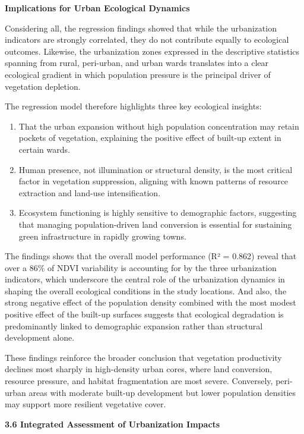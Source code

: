 \textbf{Implications for Urban Ecological Dynamics}

Considering all, the regression findings showed that while the urbanization indicators are strongly correlated, they do not contribute equally to ecological outcomes. Likewise, the urbanization zones expressed in the descriptive statistics spanning from rural, peri-urban, and urban wards translates into a clear ecological gradient in which population pressure is the principal driver of vegetation depletion.

The regression model therefore highlights three key ecological insights:

\begin{enumerate}
\def\labelenumi{\arabic{enumi}.}
\item
  That the urban expansion without high population concentration may retain pockets of vegetation, explaining the positive effect of built-up extent in certain wards.
\item
  Human presence, not illumination or structural density, is the most critical factor in vegetation suppression, aligning with known patterns of resource extraction and land-use intensification.
\item
  Ecosystem functioning is highly sensitive to demographic factors, suggesting that managing population-driven land conversion is essential for sustaining green infrastructure in rapidly growing towns.
\end{enumerate}

The findings shows that the overall model performance (R² = 0.862) reveal that over a 86\% of NDVI variability is accounting for by the three urbanization indicators, which underscore the central role of the urbanization dynamics in shaping the overall ecological conditions in the study locations. And also, the strong negative effect of the population density combined with the most modest positive effect of the built-up surfaces suggests that ecological degradation is predominantly linked to demographic expansion rather than structural development alone.

These findings reinforce the broader conclusion that vegetation productivity declines most sharply in high-density urban cores, where land conversion, resource pressure, and habitat fragmentation are most severe. Conversely, peri-urban areas with moderate built-up development but lower population densities may support more resilient vegetative cover.

{}\textbf{3.6 Integrated Assessment of Urbanization Impacts}

